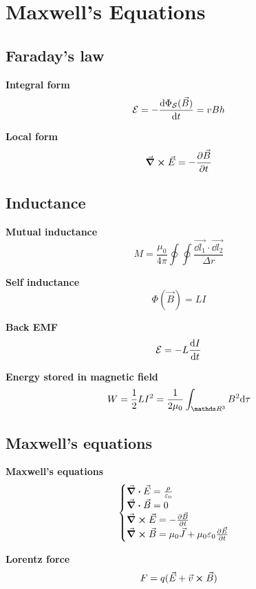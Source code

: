 \documentclass[10pt]{extarticle}
\numberwithin{equation}{section}
\begin{document}
\section{Maxwell's Equations}
\begin{multicols}{2}
	\subsection{Faraday's law}

	\textbf{Integral form}
	\begin{equation}
		\mathcal E = - \dv{\Phi_\mathcal{S}(\vec B)}{t} = v B h
	\end{equation}

	\textbf{Local form}
	\begin{equation}
		\curl \vec E = - \pdv{\vec B}{t}
	\end{equation}

	\subsection{Inductance}
	\textbf{Mutual inductance}
	\begin{equation}
		M = \frac{\mu_0}{4 \pi} \oint \oint \frac{\vec{\dd l_1} \cdot \vec{\dd l_2}}{\Delta r}
	\end{equation}

	\textbf{Self inductance}
	\begin{equation}
		\Phi(\vec B) = LI
	\end{equation}

	\textbf{Back EMF}
	\begin{equation}
		\mathcal E = - L \dv{I}{t}
	\end{equation}

	\textbf{Energy stored in magnetic field}
	\begin{equation}
		W = \half L I ^2 = \frac{1}{2 \mu_0} \int_{\R^3} B^2 \dd \tau
	\end{equation}

	\subsection{Maxwell's equations}

	\textbf{Maxwell's equations}
	\begin{equation}
		\begin{cases}
			\div \vec E = \frac{\rho}{\varepsilon_0}                          \\
			\div \vec B = 0                                                   \\
			\curl \vec E = -\pdv{\vec B}{t}                                   \\
			\curl \vec B = \mu_0 \vec J + \mu_0 \varepsilon_0 \pdv{\vec E}{t} \\
		\end{cases}
	\end{equation}

	\textbf{Lorentz force}
	\begin{equation}
		F = q(\vec E + \vec v \cross \vec B)
	\end{equation}
\end{multicols}
\end{document}
